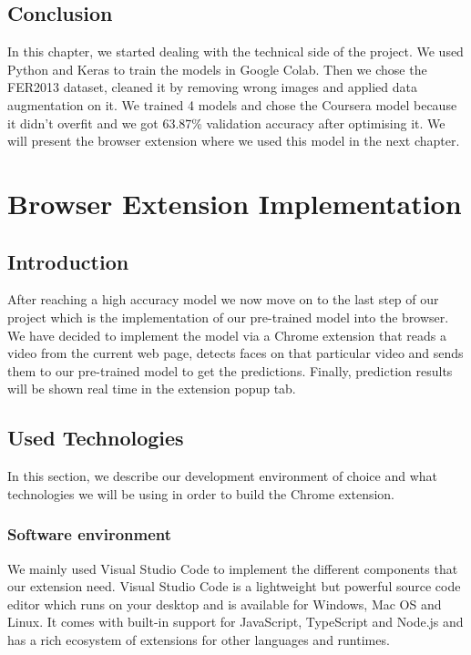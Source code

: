 \documentclass[12pt,a4paper,oneside,english]{book}
\begin{document}
\section*{Conclusion}
In this chapter, we started dealing with the technical side of the project. We used Python and Keras to train the models in Google Colab. Then we chose the FER2013 dataset, cleaned it by removing wrong images and applied data augmentation on it. We trained 4 models and chose the Coursera model because it didn't overfit and we got 63.87\% validation accuracy after optimising it. We will present the browser extension where we used this model in the next chapter.

\chapter{Browser Extension Implementation}
\label{ch:4eme}
\minitoc
\newpage
\section*{Introduction}
After reaching a high accuracy model we now move on to the last step of our project which is the implementation of our pre-trained model into the browser. We have decided to implement the model via a Chrome extension that reads a video from the current web page, detects faces on that particular video and sends them to our pre-trained model to get the predictions. Finally, prediction results will be shown real time in the extension popup tab.

\section{Used Technologies}
In this section, we describe our development environment of choice and what technologies
we will be using in order to build the Chrome extension.
\subsection{Software environment}
We mainly used Visual Studio Code to implement the different components that our extension need. Visual Studio Code \cite{VisualStudioCode} is a lightweight but powerful source code editor which runs on your desktop and is available for Windows, Mac OS and Linux. It comes with built-in support for JavaScript, TypeScript and Node.js and has a rich ecosystem of extensions for other languages and runtimes.
\end{document}
